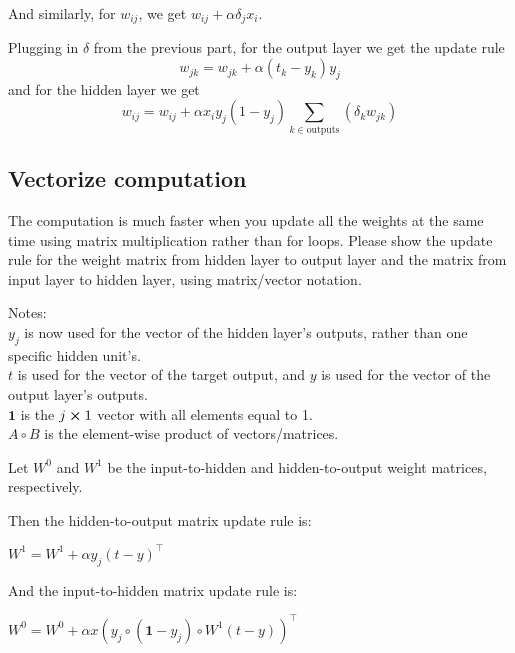 \documentclass{article} %
\begin{document}
And similarly, for $w_{ij}$, we get $w_{ij} + \alpha \delta_j x_i$.

\pagebreak

Plugging in $\delta$ from the previous part, for the output layer we get the
update rule
%
$$w_{jk} = w_{jk} + \alpha (t_k - y_k) y_j$$
and for the hidden layer we get
%
$$w_{ij} = w_{ij} + \alpha x_i y_j (1 - y_j) \sum_{k \in \text{outputs}} (\delta_k w_{jk})$$

\subsection{Vectorize computation}

The computation is much faster when you update all the weights at the same time
using matrix multiplication rather than for loops. Please show the update rule
for the weight matrix from hidden layer to output layer and the matrix from
input layer to hidden layer, using matrix/vector notation.

Notes:\\
$y_j$ is now used for the vector of the hidden layer's outputs, rather than one
specific hidden unit's.\\
$t$ is used for the vector of the target output, and $y$ is used for the vector
of the output layer's outputs.\\
$\pmb{1}$ is the $j \cross 1$ vector with all elements equal to 1.\\
$A \circ B$ is the element-wise product of vectors/matrices.

Let $W^0$ and $W^1$ be the input-to-hidden and hidden-to-output weight matrices,
respectively.

Then the hidden-to-output matrix update rule is:

$W^1 = W^1 + \alpha y_j (t - y)^\top$

And the input-to-hidden matrix update rule is:

$W^0 = W^0 + \alpha x (y_j \circ (\pmb{1} - y_j) \circ W^1 (t - y))^\top$
\end{document}
